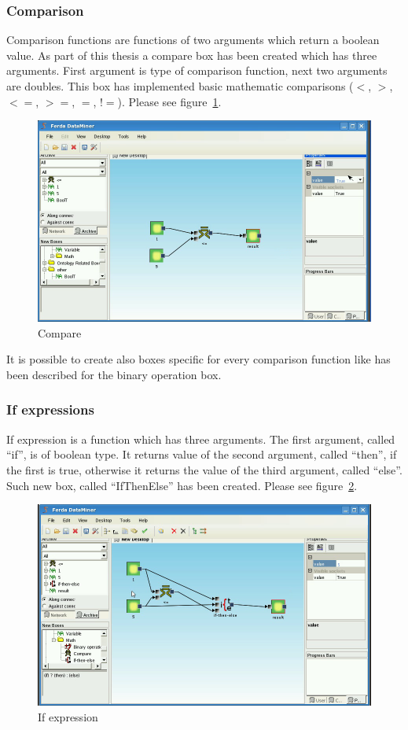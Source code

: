 \documentclass[a4paper,12pt]{book}
\begin{document}
\subsubsection{Comparison}
Comparison functions are functions of two arguments which return a boolean value. As part of this thesis a compare box has been created which has three arguments. First argument is type of comparison function, next two arguments are doubles. This box has implemented basic mathematic comparisons ($<$, $>$, $<=$, $>=$, $=$, $!=$). Please see figure~\ref{fig:boxCompare}.
\begin{figure}
	\includegraphics[width=1\textwidth]{compare2.png}
	\caption{Compare}
	\label{fig:boxCompare}
\end{figure}

It is possible to create also boxes specific for every comparison function like has been described for the binary operation box.

\subsubsection{If expressions}
If expression is a function which has three arguments. The first argument, called ``if'', is of boolean type. It returns value of the second argument, called ``then'', if the first is true, otherwise it returns the value of the third argument, called ``else''. Such new box, called ``IfThenElse'' has been created. Please see figure~\ref{fig:boxIfThenElse}.
\begin{figure}
\includegraphics[width=1\textwidth]{ifthenelse2.png}
	\caption{If expression}
	\label{fig:boxIfThenElse}
\end{figure}
\end{document}

